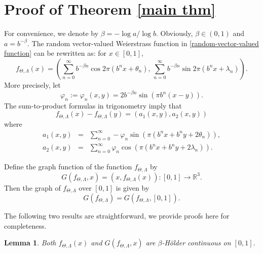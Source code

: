\documentclass[12pt, reqno]{amsart}
\theoremstyle{plain}
\newtheorem{lemma}{Lemma}[section]
\theoremstyle{definition}
\theoremstyle{remark}
\newcommand{\R}{\mathbb{R}}
\begin{document}
\section{Proof of Theorem \ref{main thm}}
For convenience, we denote by $\beta = - {\log a }/{\log b}.$ Obviously,  $\beta \in (0,1)$ and $a = b^{-\beta}$. The random vector-valued Weierstrass  function in \eqref{random-vector-valued function} can be rewritten as: for $x\in [0,1]$,
	\begin{equation*}
		f_{\Theta,\Lambda}(x) = \left( \sum_{n=0}^{\infty} b^{-\beta n} \cos 2\pi (b^n x + \theta_n),\,  \sum_{n=0}^{\infty} b^{-\beta n} \sin 2\pi (b^n x + \lambda_n) \right).
	\end{equation*}
More precisely, let
\begin{equation}\label{eq-phi-n}
	\varphi_n:=\varphi_n(x,y)=2b^{-\beta n}\sin(\pi b^n(x-y)). 
\end{equation} The sum-to-product formulas in trigonometry imply that
\begin{equation}\label{eq- vector-valued funct.}
	f_{\Theta,\Lambda}(x) -f_{\Theta,\Lambda}(y)=(a_1(x,y), a_2(x,y))
\end{equation}
 where 	
	\begin{eqnarray*}
	a_1(x,y) &=& \sum_{n=0}^{\infty} -\varphi_n \sin\left(\pi\left(b^n x + b^n y +2\theta_n\right)\right), \\
	a_2(x,y) &=& \sum_{n=0}^{\infty} \varphi_n \cos\left(\pi\left(b^n x + b^n y +2\lambda_n\right)\right).
   \end{eqnarray*}
	
Define the graph function of the function $f_{\Theta,\Lambda}$ by $$G(f_{\Theta,\Lambda}, x)= (x,  f_{\Theta,\Lambda}(x)): [0,1]\to \R^3.$$  Then the graph of  $f_{\Theta,\Lambda}$ over $[0,1]$ is given by $$G(f_{\Theta,\Lambda})=G(f_{\Theta,\Lambda}, [0,1]).$$ 

The following two results are straightforward, we provide proofs here for completeness.
	
	\begin{lemma}\label{lem-Holder}
	Both $f_{\Theta,\Lambda}(x)$ and $G(f_{\Theta,\Lambda},x)$ are $\beta$-H\"older continuous on $[0,1]$.
	\end{lemma}
	
\end{document}
